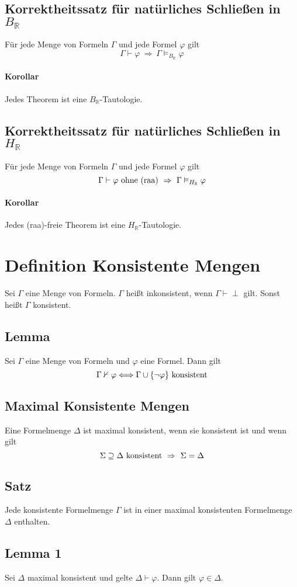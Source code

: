 \documentclass[12pt,a4paper]{report}
\newcommand{\RA}{\Rightarrow}
\newcommand{\real}{\mathbb{R}}
\newcommand{\define}[1]{\section{\blue{Definition #1}}}
\newcommand{\red}[1]{\textcolor[rgb]{0.9,0.2,0.2}{#1}}
\newcommand{\green}[1]{\textcolor[rgb]{0.1,0.6,0.1}{#1}}
\newcommand{\blue}[1]{\textcolor[rgb]{0.2,0.2,1}{#1}}
\begin{document}
\subsection{\green{Korrektheitssatz für natürliches Schließen in $ B_\real $}}
Für jede Menge von Formeln $ \Gamma $ und jede Formel $ \varphi $ gilt
\[
    \Gamma \vdash \varphi ~\RA~ \Gamma \vDash_{B_\real} \varphi
\]
\paragraph{Korollar} Jedes Theorem ist eine $ B_\real $-Tautologie.

\subsection{\green{Korrektheitssatz für natürliches Schließen in $ H_\real $}}
Für jede Menge von Formeln $ \Gamma $ und jede Formel $ \varphi $ gilt
\[
    \Gamma \vdash \varphi \textnormal{ ohne (raa)} ~\RA~ \Gamma \vDash_{H_\real} \varphi
\]
\paragraph{Korollar} Jedes (raa)-freie Theorem ist eine $ H_\real $-Tautologie.

\define{Konsistente Mengen}
Sei $ \Gamma $ eine Menge von Formeln. $ \Gamma $ heißt \red{inkonsistent}, wenn $ \Gamma \vdash \perp $ gilt. Sonst heißt $ \Gamma $ \red{konsistent}.
\subsection{\green{Lemma}}
Sei $ \Gamma $ eine Menge von Formeln und $ \varphi $ eine Formel. Dann gilt
\[
    \Gamma \nvdash \varphi \Longleftrightarrow \Gamma \cup \{\lnot \varphi\} \textnormal{ konsistent}
\]
\subsection{\blue{Maximal Konsistente Mengen}}
Eine Formelmenge $ \Delta $ ist \red{maximal konsistent}, wenn sie konsistent ist und wenn gilt
\[
    \Sigma \supseteq \Delta \textnormal{ konsistent} ~\RA~ \Sigma = \Delta
\]
\subsection{\green{Satz}}
Jede konsistente Formelmenge $ \Gamma $ ist in einer maximal konsistenten Formelmenge $ \Delta $ enthalten.
\subsection{\green{Lemma 1}}
Sei $ \Delta $ maximal konsistent und gelte $ \Delta \vdash \varphi $. Dann gilt $ \varphi \in \Delta $.
\end{document}
